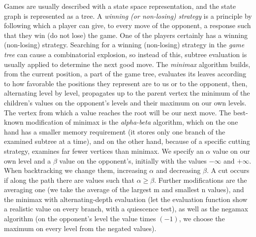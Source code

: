 \documentclass[margin=0px]{article}
\begin{document}
Games are usually described with a state space representation, and the state graph is represented as a tree.
A \textit{winning (or non-losing) strategy} is a principle by following which a player can give, to every move of the opponent, a response such that they win (do not lose) the game. One of the players certainly has a winning (non-losing) strategy. Searching for a winning (non-losing) strategy in the \textit{game tree} can cause a combinatorial explosion, so instead of this, subtree evaluation is usually applied to determine the next good move.
The \textit{minimax} algorithm builds, from the current position, a part of the game tree, evaluates its leaves according to how favorable the positions they represent are to us or to the opponent, then, alternating level by level, propagates up to the parent vertex the minimum of the children's values on the opponent's levels and their maximum on our own levels. The vertex from which a value reaches the root will be our next move.
The best-known modification of minimax is the \textit{alpha-beta} algorithm, which on the one hand has a smaller memory requirement (it stores only one branch of the examined subtree at a time), and on the other hand, because of a specific cutting strategy, examines far fewer vertices than minimax. We specify an $\alpha$ value on our own level and a $\beta$ value on the opponent's, initially with the values $-\infty$ and $+\infty$. When backtracking we change them, increasing $\alpha$ and decreasing $\beta$. A cut occurs if along the path there are values such that $\alpha \geq \beta$.
Further modifications are the averaging one (we take the average of the largest m and smallest n values), and the minimax with alternating-depth evaluation (let the evaluation function show a realistic value on every branch, with a quiescence test), as well as the negamax algorithm (on the opponent's level the value times $(-1)$, we choose the maximum on every level from the negated values).
\end{document}
